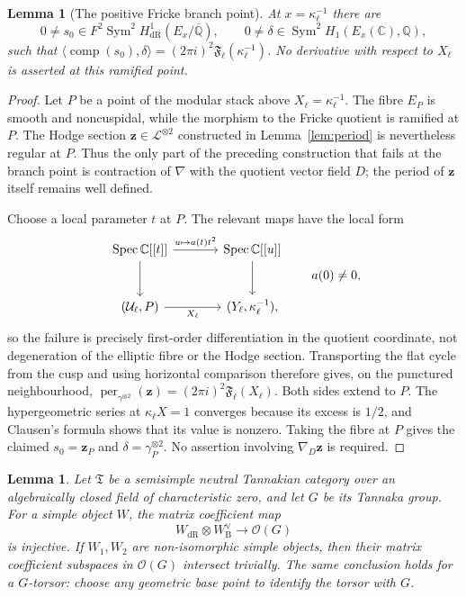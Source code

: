 \documentclass[11pt,a4paper]{amsart} %
\newtheorem{lemma}[theorem]{Lemma}
\theoremstyle{definition}
\newcommand{\Q}{\mathbb Q}
\newcommand{\Qbar}{\overline{\mathbb Q}}
\newcommand{\C}{\mathbb C}
\newcommand{\Sym}{\operatorname{Sym}}
\newcommand{\dR}{\mathrm{dR}}
\newcommand{\Betti}{\mathrm B}
\begin{document}
\begin{lemma}[The positive Fricke branch point]\label{lem:boundaryperiod}
At \(x=\kappa_\ell^{-1}\) there are
\[
0\ne s_0\in F^2\Sym^2H^1_{\dR}(E_x/\Qbar),
\qquad
0\ne\delta\in\Sym^2H_1(E_x(\C),\Q),
\]
such that $\langle\operatorname{comp}(s_0),\delta\rangle
=(2\pi i)^2{\mathfrak F}_\ell(\kappa_\ell^{-1})$. No derivative with respect to \(X_\ell\) is asserted at this ramified point.
\end{lemma}

\begin{proof}
Let \(P\) be a point of the modular stack above
\(X_\ell=\kappa_\ell^{-1}\). The fibre \(E_P\) is smooth and noncuspidal,
while the morphism to the Fricke quotient is ramified at \(P\). The Hodge
section \(\mathbf z\in\mathcal L^{\otimes2}\) constructed in
Lemma~\ref{lem:period} is nevertheless regular at \(P\). Thus the only part
of the preceding construction that fails at the branch point is contraction
of \(\nabla\) with the quotient vector field \(D\); the period of
\(\mathbf z\) itself remains well defined.

Choose a local parameter \(t\) at \(P\). The relevant maps have the local
form
\[
\begin{tikzcd}[column sep=large,row sep=large]
\operatorname{Spec}\C[[t]]
  \arrow[r,"{u\mapsto a(t)t^2}"] \arrow[d]
& \operatorname{Spec}\C[[u]] \arrow[d]\\
(\mathcal U_\ell,P) \arrow[r,"X_\ell"']
& (Y_\ell,\kappa_\ell^{-1}),
\end{tikzcd}
\qquad a(0)\ne0,
\]
so the failure is precisely first-order differentiation in the quotient
coordinate, not degeneration of the elliptic fibre or the Hodge section.
Transporting the flat cycle from the cusp and using horizontal comparison
therefore gives, on the punctured neighbourhood, $\operatorname{per}_{\gamma^{\otimes2}}(\mathbf z)=(2\pi i)^2{\mathfrak F}_\ell(X_\ell)$. Both sides extend to \(P\). The hypergeometric series at
\(\kappa_\ell X=1\) converges because its excess is \(1/2\), and Clausen's
formula shows that its value is nonzero. Taking the fibre at \(P\) gives the
claimed \(s_0=\mathbf z_P\) and \(\delta=\gamma_P^{\otimes2}\). No
assertion involving \(\nabla_D\mathbf z\) is required.
\end{proof}

\begin{lemma}\label{lem:coeff}
Let \(\mathfrak T\) be a semisimple neutral Tannakian category over an algebraically closed field of characteristic zero, and let \(G\) be its Tannaka group.
For a simple object \(W\), the matrix coefficient map
\[
W_{\dR}\otimes W_{\Betti}^{\vee}
\longrightarrow \mathcal O(G)
\]
is injective.
If \(W_1,W_2\) are non-isomorphic simple objects, then their matrix coefficient subspaces in \(\mathcal O(G)\) intersect trivially.
The same conclusion holds for a \(G\)-torsor: choose any geometric base point to identify the torsor with \(G\).
\end{lemma}
\end{document}
